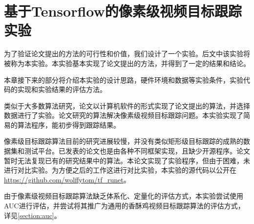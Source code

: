 
\chapter{基于Tensorflow的像素级视频目标跟踪实验} \label{section:experiment}
为了验证论文提出的方法的可行性和价值，我们设计了一个实验。后文中该实验将被称为本实验。本实验基本实现了论文提出的方法，并得到了一定的结果和结论。
\par
本章接下来的部分将介绍本实验的设计思路，硬件环境和数据等实验条件，实验代码的实现和实验结果的评估方法。
\par
类似于大多数算法研究，论文以计算机软件的形式实现了论文提出的算法，并选择数据进行了实验。论文研究的算法解决像素级视频目标跟踪问题。本实验实现了简易的算法程序，能初步得到跟踪结果。
\par
像素级目标跟踪算法目前的研究进展较慢，并没有类似矩形级目标跟踪的成熟的数据集和测试平台。已发表的论文也是由各种不同框架实现，且缺少开源程序。论文暂时无法复现已有的研究结果中的算法。本论文实现了实验程序，但由于困难，未进行对比实验。为方便之后的工作这进行对比实验，本实验的源代码以公开在\url{https://github.com/wolffytom/tf_runet}。
\par
由于像素级视频目标跟踪算法缺乏体系化、定量化的评估方式，本实验尝试使用AUC进行评估，并尝试将其推广为通用的香酥鸡视频目标跟踪算法的评估方式，详见\ref{section:auc}。

